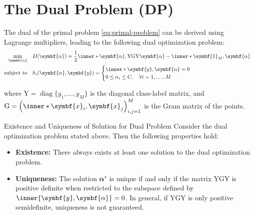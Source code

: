 \section{The Dual Problem (DP)}
The dual of the primal problem \eqref{eq:primal-problem} can be derived using Lagrange multipliers, leading to the following dual optimization problem:
\begin{align}\label{eq:dual-problem}
  \min_{\symbf{\alpha}} \quad & D(\symbf{\alpha}) = \frac{1}{2} \inner*{\symbf{\alpha}, \mathrm{Y} \mathrm{G} \mathrm{Y} \symbf{\alpha}} - \inner*{\symbf{1}_M, \symbf{\alpha}} \\
  \text{subject to} \quad     & h_i(\symbf{\alpha}, \symbf{y}) =
  \begin{cases}
    \inner*{\symbf{y}, \symbf{\alpha}} = 0 \\
    0 \leq \alpha_i \leq C, \quad \forall i = 1, \ldots, M
  \end{cases}
\end{align}

where \(\mathrm{Y} = \operatorname{diag}\{y_1, \ldots, y_M\}\) is the diagonal class-label matrix, and \(\mathrm{G} = \left(\inner*{\symbf{x}_i, \symbf{x}_j}\right)_{i,j=1}^M\) is the Gram matrix of the points.

\begin{theorem}{Existence and Uniqueness of Solution for Dual Problem}{}
  Consider the dual optimization problem stated above. Then the following properties hold:
  \begin{itemize}
    \item[(i)] \textbf{Existence:} There always exists at least one solution to the dual optimization problem.
    \item[(ii)] \textbf{Uniqueness:} The solution \(\symbf{\alpha}^\star\) is unique if and only if the matrix \(\mathrm{Y}\mathrm{G}\mathrm{Y}\) is positive definite when restricted to the subspace defined by \(\inner{\symbf{y},\symbf{\alpha}}=0\). In general, if \(\mathrm{Y}\mathrm{G}\mathrm{Y}\) is only positive semidefinite, uniqueness is not guaranteed.
  \end{itemize}
\end{theorem}

